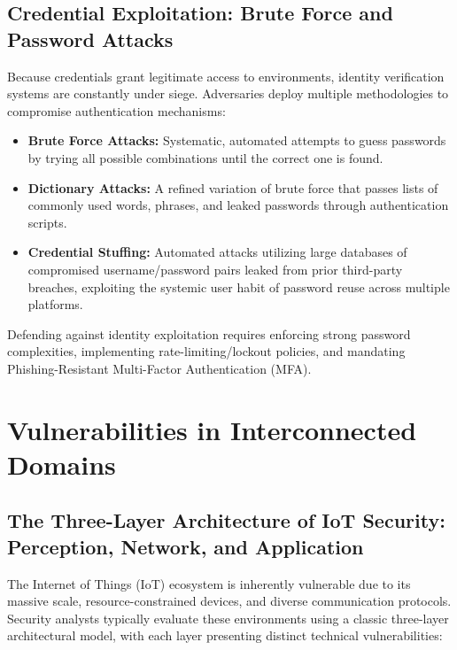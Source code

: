 \documentclass[11pt,a4paper]{article}
\begin{document}
\subsection{Credential Exploitation: Brute Force and Password Attacks}
Because credentials grant legitimate access to environments, identity verification systems are constantly under siege. Adversaries deploy multiple methodologies to compromise authentication mechanisms:

    \begin{itemize}
        \item \textbf{Brute Force Attacks:} Systematic, automated attempts to guess passwords by trying all possible combinations until the correct one is found.

        \item \textbf{Dictionary Attacks:} A refined variation of brute force that passes lists of commonly used words, phrases, and leaked passwords through authentication scripts.

        \item \textbf{Credential Stuffing:} Automated attacks utilizing large databases of compromised username/password pairs leaked from prior third-party breaches, exploiting the systemic user habit of password reuse across multiple platforms.
    \end{itemize}

Defending against identity exploitation requires enforcing strong password complexities, implementing rate-limiting/lockout policies, and mandating Phishing-Resistant Multi-Factor Authentication (MFA).

\section{Vulnerabilities in Interconnected Domains}
\subsection{The Three-Layer Architecture of IoT Security: Perception, Network, and Application}
The Internet of Things (IoT) ecosystem is inherently vulnerable due to its massive scale, resource-constrained devices, and diverse communication protocols. Security analysts typically evaluate these environments using a classic three-layer architectural model, with each layer presenting distinct technical vulnerabilities:
\end{document}
